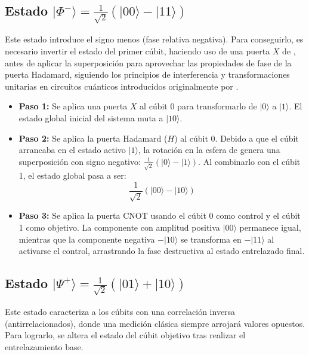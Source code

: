 \documentclass[11pt,a4paper,spanish]{book}
\begin{document}
\subsection{Estado $\lvert\Phi^-\rangle = \frac{1}{\sqrt{2}}(\lvert00\rangle - \lvert11\rangle)$}
Este estado introduce el signo menos (fase relativa negativa). Para conseguirlo, es necesario invertir el estado del primer cúbit, haciendo uso de una puerta $X$ de \cite{pauli1927} , antes de aplicar la superposición para aprovechar las propiedades de fase de la puerta Hadamard, siguiendo los principios de interferencia y transformaciones unitarias en circuitos cuánticos introducidos originalmente por \cite{deutsch1992}.
\begin{itemize}
    \item \textbf{Paso 1:} Se aplica una puerta $X$ al cúbit 0 para transformarlo de $\lvert0\rangle$ a $\lvert1\rangle$. El estado global inicial del sistema muta a $\lvert10\rangle$.
    \item \textbf{Paso 2:} Se aplica la puerta Hadamard ($H$) al cúbit 0. Debido a que el cúbit arrancaba en el estado activo $\lvert1\rangle$, la rotación en la esfera de \cite{bloch1946} genera una superposición con signo negativo: $\frac{1}{\sqrt{2}}(\lvert0\rangle - \lvert1\rangle)$. Al combinarlo con el cúbit 1, el estado global pasa a ser:
    $$\frac{1}{\sqrt{2}}(\lvert00\rangle - \lvert10\rangle)$$
\item \textbf{Paso 3:} Se aplica la puerta CNOT \citep{barenco1995} usando el cúbit 0 como control y el cúbit 1 como objetivo. La componente con amplitud positiva $\lvert00\rangle$ permanece igual, mientras que la componente negativa $-\lvert10\rangle$ se transforma en $-\lvert11\rangle$ al activarse el control, arrastrando la fase destructiva al estado entrelazado final.
\end{itemize}

\subsection{Estado $\lvert\Psi^+\rangle = \frac{1}{\sqrt{2}}(\lvert01\rangle + \lvert10\rangle)$}
Este estado caracteriza a los cúbits con una correlación inversa (antirrelacionados), donde una medición clásica siempre arrojará valores opuestos. Para lograrlo, se altera el estado del cúbit objetivo tras realizar el entrelazamiento base.
\end{document}
